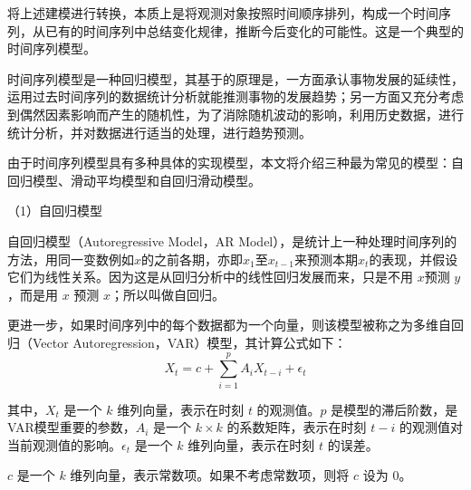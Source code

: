 \documentclass[master]{thesis-uestc}
\begin{document}
将上述建模进行转换，本质上是将观测对象按照时间顺序排列，构成一个时间序列，从已有的时间序列中总结变化规律，推断今后变化的可能性。这是一个典型的时间序列模型。

时间序列模型是一种回归模型，其基于的原理是，一方面承认事物发展的延续性，运用过去时间序列的数据统计分析就能推测事物的发展趋势；另一方面又充分考虑到偶然因素影响而产生的随机性，为了消除随机波动的影响，利用历史数据，进行统计分析，并对数据进行适当的处理，进行趋势预测。

由于时间序列模型具有多种具体的实现模型，本文将介绍三种最为常见的模型：自回归模型、滑动平均模型和自回归滑动模型。

（1）自回归模型

自回归模型（Autoregressive Model，AR Model），是统计上一种处理时间序列的方法，用同一变数例如$x$的之前各期，亦即$x_1$至$x_{t-1}$来预测本期$x_t$的表现，并假设它们为线性关系。因为这是从回归分析中的线性回归发展而来，只是不用 $x$预测 $y$ ，而是用 $x$ 预测 $x$；所以叫做自回归。

更进一步，如果时间序列中的每个数据都为一个向量，则该模型被称之为多维自回归（Vector Autoregression，VAR）模型，其计算公式如下：
\begin{equation}
    X_t = c + \sum_{i=1}^{p} A_i X_{t-i} + \epsilon_t
\end{equation}

其中，$X_t$ 是一个 $k$ 维列向量，表示在时刻 $t$ 的观测值。$p$ 是模型的滞后阶数，是VAR模型重要的参数，$A_i$ 是一个 $k \times k$ 的系数矩阵，表示在时刻 $t-i$ 的观测值对当前观测值的影响。$\epsilon_t$ 是一个 $k$ 维列向量，表示在时刻 $t$ 的误差。

$c$ 是一个 $k$ 维列向量，表示常数项。如果不考虑常数项，则将 $c$ 设为 $0$。






\end{document}

